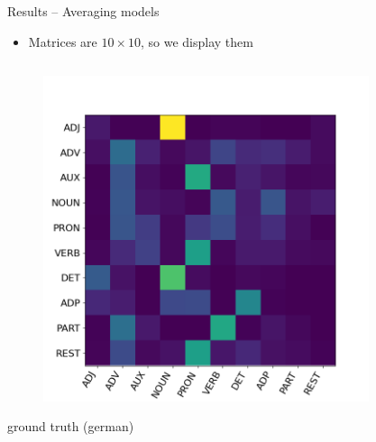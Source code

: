 
\begin{frame}{Results – Averaging models}
    \begin{itemize}
        \item Matrices are $ 10 \times 10 $, so we display them
    \end{itemize}
    \vspace*{-1.5cm}
    \begin{columns}
        \begin{column}{0.33\textwidth}
            \begin{figure}
                \centering
                \includegraphics[width=1.1\columnwidth]{Bilder/average_models/ground_truths/D_200pages_1500T_tags.png}
            \end{figure}
            \begin{center}
                {\large ground truth (german)}
            \end{center}
        \end{column}
        \begin{column}{0.33\textwidth}
            \begin{figure}
                \centering

\end{figure}
\end{column}
\end{columns}
\end{frame}
